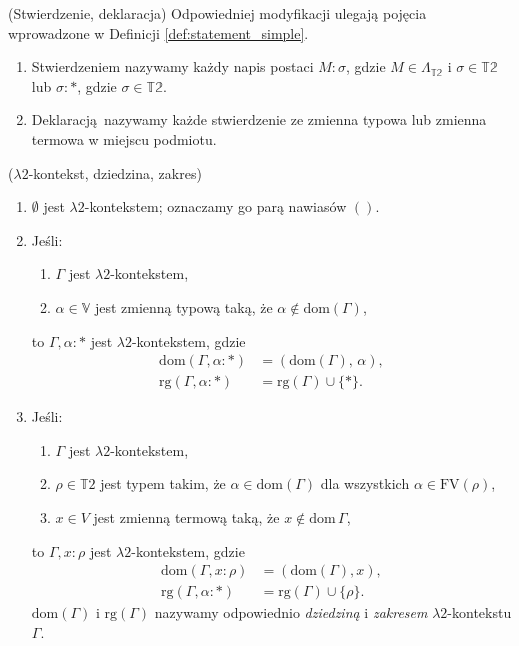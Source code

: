 \begin{definicja}(Stwierdzenie, deklaracja)
  Odpowiedniej modyfikacji ulegają pojęcia wprowadzone w Definicji \ref{def:statement_simple}.
  \begin{enumerate}
  \setlength\itemsep{0em}
    \item Stwierdzeniem nazywamy każdy napis postaci \(M:\sigma\), gdzie \(M\in\Lambda_\mathbb{T2}\) i \(\sigma\in \mathbb{T2}\) lub \(\sigma:*\), gdzie \(\sigma\in\mathbb{T2}\).
    \item  Deklaracją nazywamy każde stwierdzenie ze zmienna typowa lub zmienna termowa w miejscu podmiotu.
  \end{enumerate}
\end{definicja}
\begin{definicja}(\(\lambda 2\)-kontekst, dziedzina, zakres)
  \begin{enumerate}
  \setlength\itemsep{0em}
  \item \(\emptyset\) jest \(\lambda 2\)-kontekstem; oznaczamy go parą nawiasów 
    \(()\).
  \item Jeśli:
    \begin{enumerate}
    \item \(\Gamma\) jest \(\lambda 2\)-kontekstem,
    \item \(\alpha\in\mathbb{V}\) jest zmienną typową taką, że \(\alpha\not\in \mathrm{dom}(\Gamma)\),
    \end{enumerate}
    to \(\Gamma, \alpha:*\) jest \(\lambda 2\)-kontekstem, gdzie 
      \begin{align*} 
        \mathrm{dom}(\Gamma, \alpha:*)&=(\mathrm{dom}(\Gamma),\, \alpha),\\
        \mathrm{rg}(\Gamma, \alpha:*)&=\mathrm{rg}(\Gamma)\cup\{*\}.
      \end{align*}
  \item Jeśli:
    \begin{enumerate}
     \setlength\itemsep{0em}
     \item \(\Gamma\) jest \(\lambda 2\)-kontekstem,
     \item \(\rho\in\mathbb{T}2\) jest typem takim, że \(\alpha\in\mathrm{dom}(\Gamma)\) dla wszystkich \(\alpha\in\mathrm{FV}(\rho)\),
     \item \(x\in V\) jest zmienną termową taką, że \(x\not\in\mathrm{dom}\,\Gamma\),
    \end{enumerate}
      to \(\Gamma, x:\rho\) jest \(\lambda 2\)-kontekstem, gdzie 
      \begin{align*} 
        \mathrm{dom}(\Gamma, x:\rho)&=(\mathrm{dom}(\Gamma), x),\\
      \mathrm{rg}(\Gamma, \alpha:*)&=\mathrm{rg}(\Gamma)\cup\{\rho\}.
      \end{align*}
      \(\mathrm{dom}(\Gamma)\) i \(\mathrm{rg}(\Gamma)\) nazywamy odpowiednio \emph{dziedziną} i \emph{zakresem} \(\lambda 2\)-kontekstu \(\Gamma\).
  \end{enumerate}
\end{definicja}


